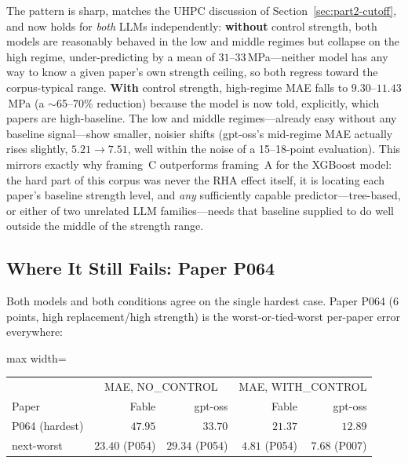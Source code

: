 \documentclass[11pt]{article}
\begin{document}
\noindent The pattern is sharp, matches the UHPC discussion of
Section~\ref{sec:part2-cutoff}, and now holds for \emph{both} LLMs independently:
\textbf{without} control strength, both models are reasonably behaved in the low and
middle regimes but collapse on the high regime, under-predicting by a mean of
$31$--$33$\,MPa---neither model has any way to know a given paper's own strength
ceiling, so both regress toward the corpus-typical range. \textbf{With} control
strength, high-regime MAE falls to $9.30$--$11.43$\,MPa (a $\sim$65--70\% reduction)
because the model is now told, explicitly, which papers are high-baseline. The low and
middle regimes---already easy without any baseline signal---show smaller, noisier
shifts (gpt-oss's mid-regime MAE actually rises slightly, $5.21\to7.51$, well within the
noise of a 15--18-point evaluation). This mirrors exactly why framing~C outperforms
framing~A for the XGBoost model: the hard part of this corpus was never the RHA effect
itself, it is locating each paper's baseline strength level, and \emph{any} sufficiently
capable predictor---tree-based, or either of two unrelated LLM families---needs that
baseline supplied to do well outside the middle of the strength range.

\subsection{Where It Still Fails: Paper P064}
Both models and both conditions agree on the single hardest case. Paper P064 (6 points,
high replacement/high strength) is the worst-or-tied-worst per-paper error everywhere:
\begin{center}\small
\begin{adjustbox}{max width=\linewidth}
\begin{tabular}{lrrrr}
\toprule
& \multicolumn{2}{c}{MAE, NO\_CONTROL} & \multicolumn{2}{c}{MAE, WITH\_CONTROL} \\
Paper & Fable & gpt-oss & Fable & gpt-oss \\
\midrule
P064 (hardest) & $47.95$ & $33.70$ & $21.37$ & $12.89$ \\
next-worst & $23.40$ (P054) & $29.34$ (P054) & $4.81$ (P054) & $7.68$ (P007) \\
\bottomrule
\end{tabular}
\end{adjustbox}
\end{center}
\end{document}

